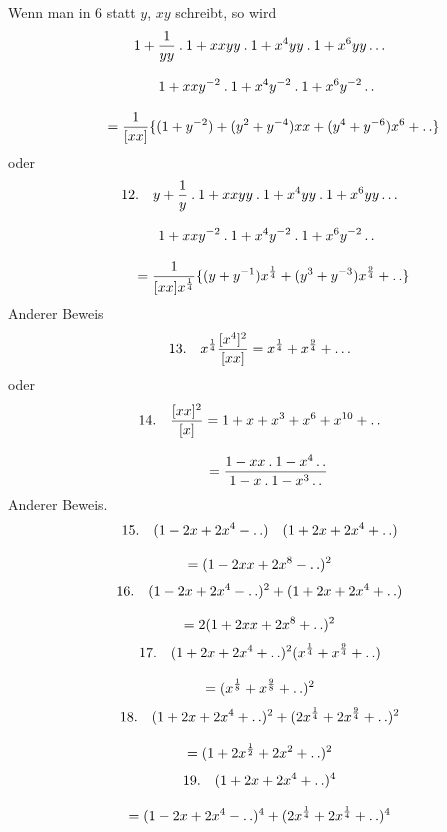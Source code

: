 Wenn man in 6 statt $y$, $xy$ schreibt, so wird
\[
\begin{gathered}
1+\frac{1}{yy}\mathbin{.}1+xxyy\mathbin{.}1+x^4yy\mathbin{.}1+x^6yy\mathinner{.\,.\,.}
\\[8pt]\quad{}1+xxy^{-2}\mathbin{.}1+x^4y^{-2}\mathbin{.}1+x^6y^{-2}\mathinner{.\,.}\\[8pt]
\qquad=\frac{1}{[xx]}\{(1+y^{-2})+(y^2+y^{-4})xx+(y^4+y^{-6})x^6+\mathinner{.\,.}\}
\end{gathered}
\]
oder
\[
\begin{gathered}
12.\quad{}y+\frac{1}{y}\mathbin{.}1+xxyy\mathbin{.}1+x^4yy\mathbin{.}1+x^6yy\mathinner{.\,.\,.}
\\[8pt]\quad{}1+xxy^{-2}\mathbin{.}1+x^4y^{-2}\mathbin{.}1+x^6y^{-2}\mathinner{.\,.}\\[8pt]
\qquad=\frac{1}{[xx]x^{\frac14}}\{(y+y^{-1})x^{\frac14}+(y^3+y^{-3})x^{\frac94}+\mathinner{.\,.}\}
\end{gathered}
\]
Anderer Beweis
\[
13.\quad x^{\frac14}\frac{[x^4]^2}{[xx]}=x^{\frac14}+x^{\frac94}+\mathinner{.\,.\,.}
\]
oder
\[
\begin{gathered}14.\quad\frac{[xx]^2}{[x]}=1+x+x^3+x^6+x^{10}+\mathinner{.\,.}
\\[8pt]\quad{}=\frac{1-xx\mathbin{.}1-x^4\mathinner{.\,.}}{1-x\mathbin{.}1-x^3\mathinner{.\,.}}\end{gathered}
\]
Anderer Beweis.
\[
\begin{gathered}15.\quad(1-2x+2x^4-\mathinner{.\,.})\quad(1+2x+2x^4+\mathinner{.\,.})
\\[8pt]=(1-2xx+2x^8-\mathinner{.\,.})^2\end{gathered}
\]
\[
\begin{gathered}16.\quad(1-2x+2x^4-\mathinner{.\,.})^2+(1+2x+2x^4+\mathinner{.\,.})
\\[8pt]=2(1+2xx+2x^8+\mathinner{.\,.})^2\end{gathered}
\]
\[
\begin{gathered}17.\quad(1+2x+2x^4+\mathinner{.\,.})^2(x^{\frac14}+x^{\frac94}+\mathinner{.\,.})
\\[8pt]=(x^{\frac18}+x^{\frac98}+\mathinner{.\,.})^2\end{gathered}
\]
\[
\begin{gathered}18.\quad(1+2x+2x^4+\mathinner{.\,.})^2+(2x^{\frac14}+2x^{\frac94}+\mathinner{.\,.})^2
\\[8pt]=(1+2x^{\frac12}+2x^2+\mathinner{.\,.})^2\end{gathered}
\]
\[
\begin{gathered}19.\quad(1+2x+2x^4+\mathinner{.\,.})^4
\\[8pt]=(1-2x+2x^4-\mathinner{.\,.})^4+(2x^{\frac14}+2x^{\frac14}+\mathinner{.\,.})^4\end{gathered}
\]
